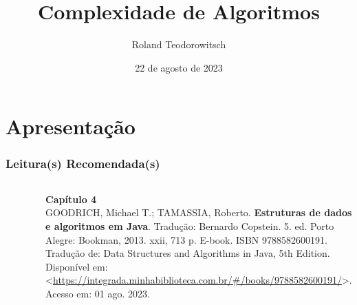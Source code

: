 \documentclass[aspectratio=169]{beamer}
\title[\sc{Complexidade de Algoritmos}]{Complexidade de Algoritmos}
\author[Roland Teodorowitsch]{Roland Teodorowitsch}
\institute[ALEST I - EP - PUCRS]{Algoritmos e Estruturas de Dados I - Escola Politécnica - PUCRS}
\date{22 de agosto de 2023}
\begin{document}
\justifying

\begin{frame}
	\titlepage
\end{frame}

\section{Apresentação}

\begin{frame}\frametitle{Leitura(s) Recomendada(s)}

\begin{columns}[T]
\begin{column}{0.15\linewidth}
\vspace{-3mm}
\begin{figure}[h]
	\centering
	\includegraphics[height=0.3\paperheight]{imagens/livro_goodrich.jpg}
\end{figure}
\end{column}
\begin{column}{0.85\linewidth}
\vspace{3mm}
\textbf{Capítulo 4}\\
\scriptsize{GOODRICH, Michael T.; TAMASSIA, Roberto. \textbf{Estruturas de dados e algoritmos em Java}. Tradução: Bernardo Copstein. 5. ed. Porto Alegre: Bookman, 2013. xxii, 713 p. E-book. ISBN 9788582600191. Tradução de: Data Structures and Algorithms in Java, 5th Edition. Disponível em: \textless{}\url{https://integrada.minhabiblioteca.com.br/\#/books/9788582600191/}\textgreater{}. Acesso em: 01 ago. 2023.}
\end{column}
\end{columns}

\vspace{5mm}


\end{frame}
\end{document}
